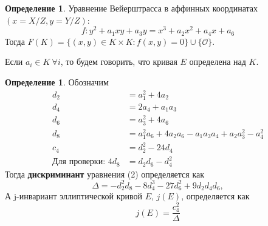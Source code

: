 \documentclass[12pt]{article}
\newcommand*{\union}{\mathbin{\cup}}
\newcommand{\bigO}{\mathcal{O}}
\theoremstyle{definition}
\newtheorem{definition}[theorem]{Определение}
\theoremstyle{definition}
\theoremstyle{definition}
\begin{document}
            \begin{definition} 
                Уравнение Вейерштрасса в аффинных координатах $(x=X/Z, y=Y/Z)$:
                \begin{equation}\label{eq:weierstrassequation}
                    f: y^2+a_1xy + a_3y = x^3 + a_2x^2 + a_4x + a_6
                \end{equation}
                Тогда $F(K) = \{ (x,y) \in K \times K: f(x,y)=0 \} \union \{\bigO\}$.
                
                Если $a_i \in K \  \forall i$, то будем говорить, что кривая $E$ определена над $K$.
            \end{definition}
            
            \begin{definition}
                Обозначим
                \begin{align}
                    d_2 &= a_1^2 + 4a_2 \\ \nonumber
                    d_4 &= 2a_4 + a_1a_3 \\ \nonumber
                    d_6 &= a_3^2 + 4a_6 \\ \nonumber
                    d_8 &= a_1^2a_6 + 4a_2a_6 - a_1a_3a_4 + a_2a_3^2 - a_4^2 \\ \nonumber
                    c_4 &= d_2^2 - 24d_4 \\ \nonumber
                    \text{Для проверки: } 4d_8 &= d_2d_6 - d_4^2
                \end{align}
                Тогда \textbf{дискриминант} уравнения (2) определяется как 
                \[
                    \Delta = -d_2^2d_8 - 8d_4^3-27d_6^2+9d_2d_4d_6,
                \]
                А j-инвариант эллиптической кривой $E$, $j(E)$, определяется как 
                \[
                    j(E) = \frac{c_4^2}{\Delta}
                \]
            \end{definition}
            
\end{document}
